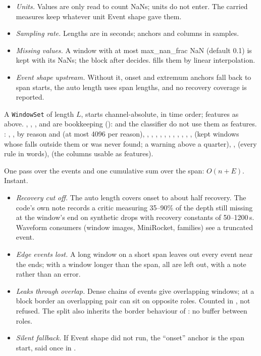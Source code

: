 \begin{itemize}
\item \emph{Units.} Values are only read to count NaNs; units do not enter. The carried measures
  keep whatever unit Event shape gave them.
\item \emph{Sampling rate.} Lengths are in seconds; anchors and  columns in samples.
\item \emph{Missing values.} A window with at most max\_nan\_frac NaN (default 0.1) is kept with
  its NaNs; the block after decides.  fills them by linear
  interpolation.
\item \emph{Event shape upstream.} Without it, onset and extremum anchors fall back to span
  starts, the auto length uses span lengths, and no recovery coverage is reported.
\end{itemize}

A \texttt{WindowSet} of length $L$, starts channel-absolute, in time order; features as above.
, , ,  and
 are bookkeeping ():  and
the classifier do not use them as features. : , ,
 by reason and  (at most 4096 per reason), ,
, , , , ,
, , , ,
,  (kept windows whose 
falls outside them or was never found; a warning above a quarter), ,
 (every rule in words),  (the columns usable as features).

One pass over the events and one cumulative sum over the span: $O(n + E)$. Instant.

\begin{itemize}
\item \emph{Recovery cut off.} The auto length covers onset to about half recovery. The code's
  own note records a critic measuring 35--90\% of the depth still missing at the window's end on
  synthetic drops with recovery constants of 50--1200\,s. Waveform consumers (window images,
  MiniRocket, families) see a truncated event.
\item \emph{Edge events lost.} A long window on a short span leaves out every event near the
  ends; with a window longer than the span, all are left out, with a note rather than an error.
\item \emph{Leaks through overlap.} Dense chains of events give overlapping windows; at a block
  border an overlapping pair can sit on opposite roles. Counted in , not
  refused. The split also inherits the border behaviour of
  : no buffer between roles.
\item \emph{Silent fallback.} If Event shape did not run, the ``onset'' anchor is the span start,
  said once in .
\end{itemize}


